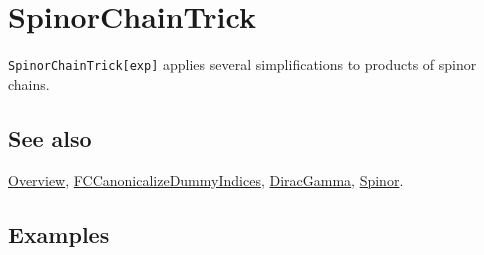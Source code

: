 \documentclass[../FeynCalcManual.tex]{subfiles}
\begin{document}
\hypertarget{spinorchaintrick}{
\section{SpinorChainTrick}\label{spinorchaintrick}}

\texttt{SpinorChainTrick[\allowbreak{}exp]} applies several
simplifications to products of spinor chains.

\subsection{See also}

\hyperlink{toc}{Overview},
\hyperlink{fccanonicalizedummyindices}{FCCanonicalizeDummyIndices},
\hyperlink{diracgamma}{DiracGamma}, \hyperlink{spinor}{Spinor}.

\subsection{Examples}

\begin{Shaded}
\begin{Highlighting}[]
\OperatorTok{[}\OperatorTok{,}\OperatorTok{]}\OperatorTok{[}\SpecialCharTok{\textbackslash{}}\OperatorTok{[}\OperatorTok{]]}\OperatorTok{[}\OperatorTok{,}\OperatorTok{]}\OperatorTok{[}\OperatorTok{,}\OperatorTok{]}\OperatorTok{[}\SpecialCharTok{\textbackslash{}}\OperatorTok{[}\OperatorTok{]]}\OperatorTok{[}\OperatorTok{,}\OperatorTok{]} \SpecialCharTok{+}
   \OperatorTok{[}\OperatorTok{,}\OperatorTok{]}\OperatorTok{[}\SpecialCharTok{\textbackslash{}}\OperatorTok{[}\OperatorTok{]]}\OperatorTok{[}\OperatorTok{,}\OperatorTok{]}\OperatorTok{[}\OperatorTok{,}\OperatorTok{]}\OperatorTok{[}\SpecialCharTok{\textbackslash{}}\OperatorTok{[}\OperatorTok{]]}\OperatorTok{[}\OperatorTok{,}\OperatorTok{]} 
 
\OperatorTok{[}\SpecialCharTok{\%}\OperatorTok{]}
\end{Highlighting}
\end{Shaded}
\end{document}
